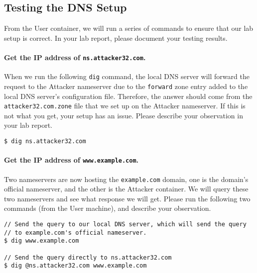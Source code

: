 

\subsection{Testing the DNS Setup}

From the User container, we will run a series of commands to ensure 
that our lab setup is correct. In your lab report, please document
your testing results. 


\paragraph{Get the IP address of \texttt{ns.attacker32.com}.}
When we run the following \texttt{dig} command, 
the local DNS server will forward the request to the Attacker nameserver 
due to the \texttt{forward} zone entry added to the local DNS server's
configuration file. Therefore, the answer should come from
the \texttt{attacker32.com.zone} file that we set up on the Attacker nameserver.
If this is not what you get, your setup has an issue. Please describe your
observation in your lab report. 

\begin{lstlisting}
$ dig ns.attacker32.com
\end{lstlisting}



\paragraph{Get the IP address of \texttt{www.example.com}.} 
Two nameservers are now hosting the \texttt{example.com} 
domain, one is the domain's official nameserver, and the other 
is the Attacker container. We will query these two nameservers and see what 
response we will get. 
Please run the following two commands (from the User machine), 
and describe your observation. 


\begin{lstlisting}
// Send the query to our local DNS server, which will send the query
// to example.com's official nameserver. 
$ dig www.example.com

// Send the query directly to ns.attacker32.com 
$ dig @ns.attacker32.com www.example.com
\end{lstlisting}
 



